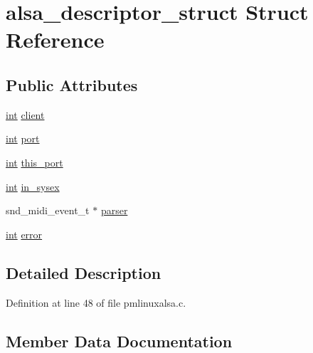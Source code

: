 \hypertarget{structalsa__descriptor__struct}{}\section{alsa\+\_\+descriptor\+\_\+struct Struct Reference}
\label{structalsa__descriptor__struct}
\subsection*{Public Attributes}
\begin{DoxyCompactItemize}
\item 
\hyperlink{xmltok_8h_a5a0d4a5641ce434f1d23533f2b2e6653}{int} \hyperlink{structalsa__descriptor__struct_a5e07931ecedb249e30d2af6bce04d440}{client}
\item 
\hyperlink{xmltok_8h_a5a0d4a5641ce434f1d23533f2b2e6653}{int} \hyperlink{structalsa__descriptor__struct_af44fabb4f59f5e7140a0886137694914}{port}
\item 
\hyperlink{xmltok_8h_a5a0d4a5641ce434f1d23533f2b2e6653}{int} \hyperlink{structalsa__descriptor__struct_a99d58c148eddf8bea8f1fbc67c8d640d}{this\+\_\+port}
\item 
\hyperlink{xmltok_8h_a5a0d4a5641ce434f1d23533f2b2e6653}{int} \hyperlink{structalsa__descriptor__struct_a846e4059a158f06992ddba837d74a4f4}{in\+\_\+sysex}
\item 
snd\+\_\+midi\+\_\+event\+\_\+t $\ast$ \hyperlink{structalsa__descriptor__struct_a6f4027d2a0dd8eeaeb4d802cc1b10edb}{parser}
\item 
\hyperlink{xmltok_8h_a5a0d4a5641ce434f1d23533f2b2e6653}{int} \hyperlink{structalsa__descriptor__struct_a72ee47beba102ffed919a03c7657a087}{error}
\end{DoxyCompactItemize}


\subsection{Detailed Description}


Definition at line 48 of file pmlinuxalsa.\+c.



\subsection{Member Data Documentation}
